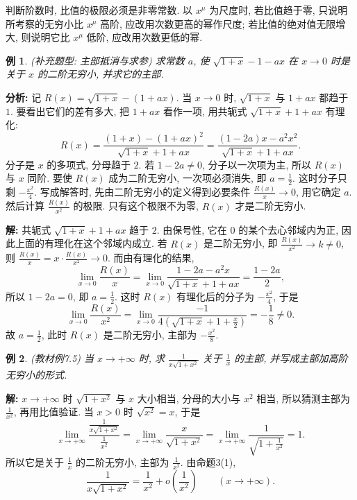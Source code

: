 \documentclass[UTF8,openany]{ctexbook}
\theoremstyle{chinesetextbook}
\newtheorem{example}{例}[section]
\newenvironment{cnsolution}{\par\indent\textbf{解:} \ignorespaces}{\par}
\begin{document}
判断阶数时, 比值的极限必须是非零常数. 以 $x^\mu$ 为尺度时, 若比值趋于零, 只说明所考察的无穷小比 $x^\mu$ 高阶, 应改用次数更高的幂作尺度; 若比值的绝对值无限增大, 则说明它比 $x^\mu$ 低阶, 应改用次数更低的幂.
\begin{example}
\textnormal{(补充题型: 主部抵消与求参)} 求常数 $a$, 使 $\sqrt{1+x}-1-ax$ 在 $x\to0$ 时是关于 $x$ 的二阶无穷小, 并求它的主部.
\end{example}
\par\indent\textbf{分析:} 记 $R(x)=\sqrt{1+x}-(1+ax)$. 当 $x\to0$ 时, $\sqrt{1+x}$ 与 $1+ax$ 都趋于 $1$. 要看出它们的差有多大, 把 $1+ax$ 看作一项, 用共轭式 $\sqrt{1+x}+1+ax$ 有理化:
\[
R(x)=\frac{(1+x)-(1+ax)^2}{\sqrt{1+x}+1+ax}=\frac{(1-2a)x-a^2x^2}{\sqrt{1+x}+1+ax}.
\]
分子是 $x$ 的多项式, 分母趋于 $2$. 若 $1-2a\ne0$, 分子以一次项为主, 所以 $R(x)$ 与 $x$ 同阶. 要使 $R(x)$ 成为二阶无穷小, 一次项必须消失, 即 $\displaystyle a=\frac12$. 这时分子只剩 $\displaystyle-\frac{x^2}4$. 写成解答时, 先由二阶无穷小的定义得到必要条件 $\displaystyle\frac{R(x)}x\to0$, 用它确定 $a$. 然后计算 $\displaystyle\frac{R(x)}{x^2}$ 的极限. 只有这个极限不为零, $R(x)$ 才是二阶无穷小.
\begin{cnsolution}
共轭式 $\sqrt{1+x}+1+ax$ 趋于 $2$. 由保号性, 它在 $0$ 的某个去心邻域内为正, 因此上面的有理化在这个邻域内成立. 若 $R(x)$ 是二阶无穷小, 即 $\displaystyle\frac{R(x)}{x^2}\to k\ne0$, 则 $\displaystyle\frac{R(x)}x=x\cdot\frac{R(x)}{x^2}\to0$. 而由有理化的结果,
\[
\lim_{x\to0}\frac{R(x)}x=\lim_{x\to0}\frac{1-2a-a^2x}{\sqrt{1+x}+1+ax}=\frac{1-2a}2,
\]
所以 $1-2a=0$, 即 $\displaystyle a=\frac12$. 这时 $R(x)$ 有理化后的分子为 $\displaystyle-\frac{x^2}4$, 于是
\[
\lim_{x\to0}\frac{R(x)}{x^2}=\lim_{x\to0}\frac{-1}{4\left(\sqrt{1+x}+1+\frac x2\right)}=-\frac18\ne0.
\]
故 $\displaystyle a=\frac12$, 此时 $R(x)$ 是二阶无穷小, 主部为 $\displaystyle-\frac{x^2}8$.
\end{cnsolution}
\begin{example}
\textnormal{(教材例7.5)} 当 $x\to+\infty$ 时, 求 $\displaystyle\frac1{x\sqrt{1+x^2}}$ 关于 $\displaystyle\frac1x$ 的主部, 并写成主部加高阶无穷小的形式.
\end{example}
\begin{cnsolution}
$x\to+\infty$ 时 $\sqrt{1+x^2}$ 与 $x$ 大小相当, 分母的大小与 $x^2$ 相当, 所以猜测主部为 $\displaystyle\frac1{x^2}$, 再用比值验证. 当 $x>0$ 时 $\sqrt{x^2}=x$, 于是
\[
\lim_{x\to+\infty}\frac{\frac1{x\sqrt{1+x^2}}}{\frac1{x^2}}=\lim_{x\to+\infty}\frac x{\sqrt{1+x^2}}=\lim_{x\to+\infty}\frac1{\sqrt{1+\frac1{x^2}}}=1.
\]
所以它是关于 $\displaystyle\frac1x$ 的二阶无穷小, 主部为 $\displaystyle\frac1{x^2}$. 由命题3(1),
\[
\frac1{x\sqrt{1+x^2}}=\frac1{x^2}+o\!\left(\frac1{x^2}\right)\qquad(x\to+\infty).
\]
\end{cnsolution}
\end{document}
